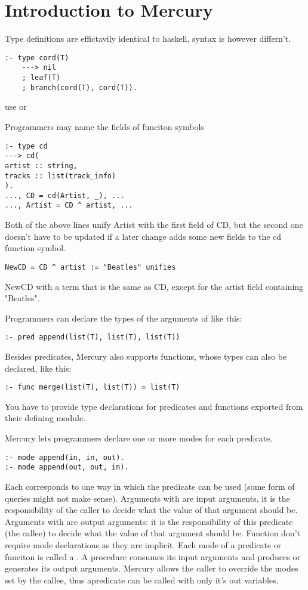 \section{Introduction to Mercury}
\begin{compactitem}
\item Type definitions are effictavily identical to haskell, syntax is however differn't.
\begin{lstlisting}
:- type cord(T)
    ---> nil
    ; leaf(T)
    ; branch(cord(T), cord(T)).
\end{lstlisting}
\item {} use \e{$\%$} or 
\item Programmers may name the fields of funciton symbols 
\begin{lstlisting}
:- type cd
---> cd(
artist :: string,
tracks :: list(track_info)
).
..., CD = cd(Artist, _), ...
..., Artist = CD ^ artist, ...
\end{lstlisting}
Both of the above lines unify Artist with the first
field of CD, but the second one doesn’t have to be
updated if a later change adds some new fields to
the cd function symbol. 
\begin{lstlisting}
NewCD = CD ^ artist := "Beatles" unifies
\end{lstlisting}
NewCD with a term that is the same as CD, except
for the artist field containing "Beatles".



\item Programmers can declare the types of the arguments of  like this:
\begin{lstlisting}
:- pred append(list(T), list(T), list(T))
\end{lstlisting}
\item Besides predicates, Mercury also supports functions, whose types can also be declared, like this:
\begin{lstlisting}
:- func merge(list(T), list(T)) = list(T)
\end{lstlisting}
\item You have to provide type declarations for predicates and functions exported from their defining
module.
\item Mercury lets programmers declare one or more
modes for each predicate. 
\begin{lstlisting}
:- mode append(in, in, out).
:- mode append(out, out, in).
\end{lstlisting}
Each corresponds to one
way in which the predicate can be used (some form of queries might not make sense). Arguments with  are input arguments, it is the responsibility of the caller to decide
what the value of that argument should be. Arguments with  are output arguments: it is the responsibility of this predicate
(the callee) to decide what the value of that
argument should be. Function don't require mode declarations as they are implicit. Each mode of a predicate or funciton is called a . A procedure consumes its input arguments and produces or generates its output arguments. Mercury allows the caller to override the modes set by the callee, thus apredicate can be called with only it's out variables.


\end{compactitem}
